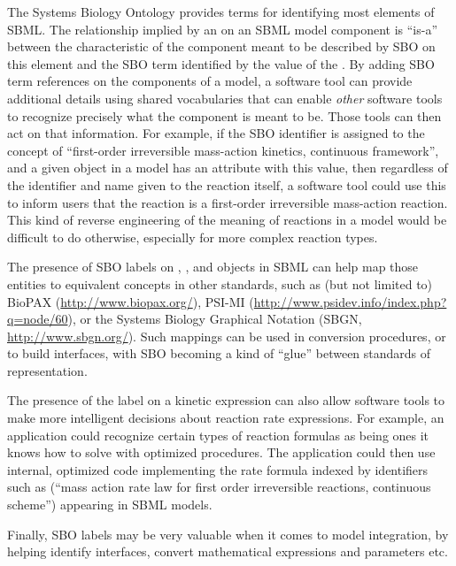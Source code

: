 The Systems Biology Ontology provides terms for identifying
most elements of SBML.  The relationship implied by an
 on an SBML model component is ``is-a'' between the
characteristic of the component meant to be described by SBO on
this element and the SBO term identified by the value of the
.  By adding SBO term references on the components
of a model, a software tool can provide additional details using
shared vocabularies that can enable \emph{other} software tools to
recognize precisely what the component is meant to be.  Those
tools can then act on that information.  For example, if the SBO
identifier  is assigned to the concept of
``first-order irreversible mass-action kinetics, continuous
framework'', and a given \KineticLaw object in a model has an
 attribute with this value, then regardless of the
identifier and name given to the reaction itself, a software tool
could use this to inform users that the reaction is a first-order
irreversible mass-action reaction.  This kind of reverse
engineering of the meaning of reactions in a model would be
difficult to do otherwise, especially for more complex reaction
types.

The presence of SBO labels on \Compartment, \Species, and
\Reaction objects in SBML can help map those entities to
equivalent concepts in other standards, such as (but not limited
to) BioPAX (\url{http://www.biopax.org/}), PSI-MI
(\url{http://www.psidev.info/index.php?q=node/60}), or the Systems
Biology Graphical Notation (SBGN, \url{http://www.sbgn.org/}).
Such mappings can be used in conversion procedures, or to build
interfaces, with SBO becoming a kind of ``glue'' between standards
of representation.

The presence of the label on a kinetic expression can also allow
software tools to make more intelligent decisions about reaction
rate expressions.  For example, an application could recognize
certain types of reaction formulas as being ones it
knows how to solve with optimized procedures.  The application
could then use internal, optimized code implementing the rate
formula indexed by identifiers such as 
(``mass action rate law for first order irreversible reactions,
continuous scheme'') appearing in SBML models.

Finally, SBO labels may be very valuable when it comes to model
integration, by helping identify interfaces, convert mathematical
expressions and parameters etc.

